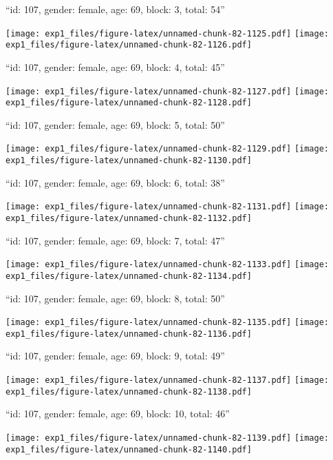 \documentclass[11pt,,]{article}
\begin{document}
\newpage
[1] 

``id: 107, gender: female, age: 69, block: 3, total: 54''

\texttt{[image: exp1\_files/figure-latex/unnamed-chunk-82-1125.pdf]}
\texttt{[image: exp1\_files/figure-latex/unnamed-chunk-82-1126.pdf]}

\newpage
[1] 

``id: 107, gender: female, age: 69, block: 4, total: 45''

\texttt{[image: exp1\_files/figure-latex/unnamed-chunk-82-1127.pdf]}
\texttt{[image: exp1\_files/figure-latex/unnamed-chunk-82-1128.pdf]}

\newpage
[1] 

``id: 107, gender: female, age: 69, block: 5, total: 50''

\texttt{[image: exp1\_files/figure-latex/unnamed-chunk-82-1129.pdf]}
\texttt{[image: exp1\_files/figure-latex/unnamed-chunk-82-1130.pdf]}

\newpage
[1] 

``id: 107, gender: female, age: 69, block: 6, total: 38''

\texttt{[image: exp1\_files/figure-latex/unnamed-chunk-82-1131.pdf]}
\texttt{[image: exp1\_files/figure-latex/unnamed-chunk-82-1132.pdf]}

\newpage
[1] 

``id: 107, gender: female, age: 69, block: 7, total: 47''

\texttt{[image: exp1\_files/figure-latex/unnamed-chunk-82-1133.pdf]}
\texttt{[image: exp1\_files/figure-latex/unnamed-chunk-82-1134.pdf]}

\newpage
[1] 

``id: 107, gender: female, age: 69, block: 8, total: 50''

\texttt{[image: exp1\_files/figure-latex/unnamed-chunk-82-1135.pdf]}
\texttt{[image: exp1\_files/figure-latex/unnamed-chunk-82-1136.pdf]}

\newpage
[1] 

``id: 107, gender: female, age: 69, block: 9, total: 49''

\texttt{[image: exp1\_files/figure-latex/unnamed-chunk-82-1137.pdf]}
\texttt{[image: exp1\_files/figure-latex/unnamed-chunk-82-1138.pdf]}

\newpage
[1] 

``id: 107, gender: female, age: 69, block: 10, total: 46''

\texttt{[image: exp1\_files/figure-latex/unnamed-chunk-82-1139.pdf]}
\texttt{[image: exp1\_files/figure-latex/unnamed-chunk-82-1140.pdf]}
\end{document}
